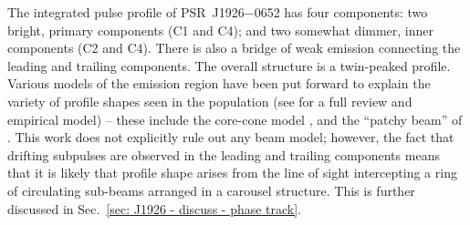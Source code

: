 The integrated pulse profile of PSR~J1926$-$0652 has four components: two bright, primary components (C1 and C4); and two somewhat dimmer, inner components (C2 and C4). There is also a bridge of weak emission connecting the leading and trailing components. The overall structure is a twin-peaked profile. Various models of the emission region have been put forward to explain the variety of profile shapes seen in the population (see \citealt{KJxx2007} for a full review and empirical model) -- these include the core-cone model \citep[e.g.][]{Rxxx1983a, Rxxx1986}, and the ``patchy beam'' of \citet{LMxx1988}. This work does not explicitly rule out any beam model; however, the fact that drifting subpulses are observed in the leading and trailing components means that it is likely that profile shape arises from the line of sight intercepting a ring of circulating sub-beams arranged in a carousel structure. This is further discussed in Sec.~\ref{sec: J1926 - discuss - phase track}.

